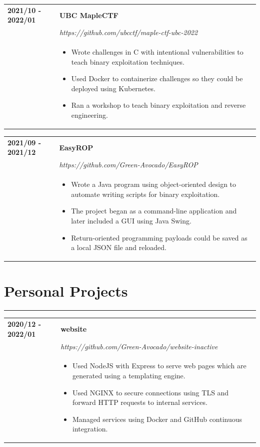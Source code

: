 \documentclass[letterpaper]{article}
\newcommand{\sectcolor}{cyan}
\newcommand{\sect}[1]{\section*{#1}
                        {\color{\sectcolor}
                        \rule{\textwidth}{1pt}
                        \vspace{-7pt}}}
\begin{document}
        \begin{tabular}{p{} p{}}
            \textbf{2021/10 - 2022/01} & \textbf{UBC MapleCTF} \\
            & \emph{https://github.com/ubcctf/maple-ctf-ubc-2022} \\
            & \begin{itemize}
                \item Wrote challenges in C with intentional vulnerabilities to teach binary exploitation
                    techniques.
                \item Used Docker to containerize challenges so they could be deployed using Kubernetes.
                \item Ran a workshop to teach binary exploitation and reverse engineering.
            \end{itemize}
        \end{tabular}

        \begin{tabular}{p{} p{}}
            \textbf{2021/09 - 2021/12} & \textbf{EasyROP} \\
            & \emph{https://github.com/Green-Avocado/EasyROP} \\
            & \begin{itemize}
                \item Wrote a Java program using object-oriented design to automate writing scripts for
                    binary exploitation.
                \item The project began as a command-line application and later included a GUI using Java
                    Swing.
                \item Return-oriented programming payloads could be saved as a local JSON file and
                    reloaded.
            \end{itemize}
        \end{tabular}

    \sect{Personal Projects}

        \begin{tabular}{p{} p{}}
            \textbf{2020/12 - 2022/01} & \textbf{website} \\
            & \emph{https://github.com/Green-Avocado/website-inactive} \\
            & \begin{itemize}
                \item Used NodeJS with Express to serve web pages which are generated using a templating
                    engine.
                \item Used NGINX to secure connections using TLS and forward HTTP requests to internal
                    services.
                \item Managed services using Docker and GitHub continuous integration.
            \end{itemize}
        \end{tabular}
\end{document}
